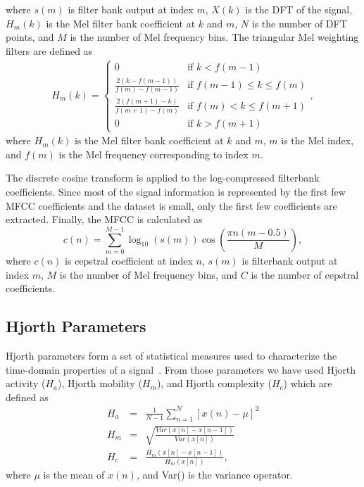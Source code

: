 \documentclass[applsci,article,accept,moreauthors,pdftex]{Definitions/mdpi}
\begin{document}
where $s(m)$ is filter bank output at index $m$, $X(k)$ is the DFT of the signal, $H_m(k)$ is the Mel filter bank coefficient at $k$ and $m$, $N$ is the number of DFT points, and $M$ is the number of Mel frequency bins. The triangular Mel weighting filters are defined as
\begin{align}
	H_m(k) =
	\begin{cases}
		0 & \text{if } k < f(m - 1) \\
		\frac{2(k - f(m - 1))}{f(m) - f(m - 1)} & \text{if } f(m - 1) \leq k \leq f(m) \\
		\frac{2(f(m + 1) - k)}{f(m + 1) - f(m)} & \text{if } f(m) < k \leq f(m + 1) \\
		0 & \text{if } k > f(m + 1)
	\end{cases},
\end{align}
where $H_m(k)$ is the Mel filter bank coefficient at $k$ and $m$, $m$ is the Mel index, and $f(m)$ is the Mel frequency corresponding to index $m$.\par
The discrete cosine transform is applied to the log-compressed filterbank coefficients. Since most of the signal information is represented by the first few MFCC coefficients and the dataset is small, only the first few coefficients are extracted. Finally, the MFCC is calculated as
\begin{equation}
	c(n) = \sum_{m=0}^{M-1} \log_{10}(s(m)) \cos\left(\frac{\pi n (m - 0.5)}{M}\right),
\end{equation}
where $c(n)$ is cepstral coefficient at index $n$, $s(m)$ is filterbank output at index $m$, $M$ is the number of Mel frequency bins, and $C$ is the number of cepstral coefficients.
\subsection{Hjorth Parameters}
Hjorth parameters form a set of statistical measures used to characterize the time-domain properties of a signal~\cite{wannawijit2019ecg}. From those parameters we have used Hjorth activity ($H_a$), Hjorth mobility ($H_m$), and Hjorth complexity ($H_c$) which are defined as
\begin{eqnarray}
	H_a &=& \frac{1}{N-1} \sum_{n=1}^{N}[x(n) - \mu]^2\\
	H_m &=& \sqrt{\frac{Var(x[n] - x[n-1])}{Var(x[n])}}\\
	H_c &=& \frac{H_m(x[n] - x[n-1])}{H_m(x[n])},
\end{eqnarray}
where $\mu$ is the mean of $x(n)$, and Var() is the variance operator.
\end{document}
